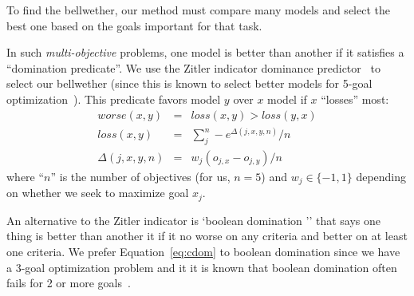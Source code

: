 \documentclass[10pt,journal,compsoc]{IEEEtran}
\begin{document}
To find the bellwether, our method must compare many models and select the best one based on the goals important for that task. 

In such   {\em multi-objective} problems, one model is better than another if it
 satisfies a ``domination predicate''.
 We use the Zitler indicator dominance
 predictor~\cite{zit02} to select our bellwether (since this is known to select better models
 for 5-goal optimization~\cite{Sayyad:2013,Sayyad:2013:SPL}).
This predicate favors model
  $y$ over $x$  model if $x$ ``losses'' most:
\begin{equation}\label{eq:cdom}
\begin{array}{rcl}
\textit{worse}(x,y)& =& \textit{loss}(x,y) > \textit{loss}(y,x)\\
\textit{loss}(x,y)& = &\sum_j^n -e^{\Delta(j,x,y,n)}/n\\
\Delta(j,x,y,n) & = & w_j(o_{j,x}  - o_{j,y})/n
\end{array}
\end{equation}
where  ``$n$'' is the number of objectives (for us, $n=5$) and $w_j\in \{-1,1\}$ depending on whether
we seek to maximize goal $x_j$.  

An alternative to the Zitler indicator is    `boolean domination '' that says one thing is better than another it if it no worse on any criteria and better on at least one criteria. We prefer Equation~\ref{eq:cdom} to boolean domination since we have a   3-goal optimization problem and it it is known that boolean domination often  fails for 2 or more goals~\cite{Wagner:2007,Sayyad:2013}. 
 
\end{document}
